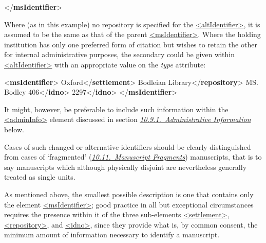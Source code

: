 \begin{shaded}
{</\textbf{msIdentifier}>}\end{shaded}\egroup\par \noindent  Where (as in this example) no repository is specified for the \hyperref[TEI.altIdentifier]{<altIdentifier>}, it is assumed to be the same as that of the parent \hyperref[TEI.msIdentifier]{<msIdentifier>}. Where the holding institution has only one preferred form of citation but wishes to retain the other for internal administrative purposes, the secondary could be given within \hyperref[TEI.altIdentifier]{<altIdentifier>} with an appropriate value on the {\itshape type} attribute: \par\bgroup{}\exampleFont \begin{shaded}\noindent\mbox{}{<\textbf{msIdentifier}>}\mbox{}\newline 
{}Oxford{</\textbf{settlement}>}\mbox{}\newline 
{}Bodleian Library{</\textbf{repository}>}\mbox{}\newline 
{}MS. Bodley 406{</\textbf{idno}>}\mbox{}\newline 
{}\mbox{}\newline 
\hspace*{1em}2297{</\textbf{idno}>}\mbox{}\newline 
{}\mbox{}\newline 
{</\textbf{msIdentifier}>}\end{shaded}\egroup\par \noindent  It might, however, be preferable to include such information within the \hyperref[TEI.adminInfo]{<adminInfo>} element discussed in section \textit{\hyperref[msadad]{10.9.1.\ Administrative Information}} below.\par
Cases of such changed or alternative identifiers should be clearly distinguished from cases of ‘fragmented’ (\textit{\hyperref[msfg]{10.11.\ Manuscript Fragments}}) manuscripts, that is to say manuscripts which although physically disjoint are nevertheless generally treated as single units.\par
As mentioned above, the smallest possible description is one that contains only the element \hyperref[TEI.msIdentifier]{<msIdentifier>}; good practice in all but exceptional circumstances requires the presence within it of the three sub-elements \hyperref[TEI.settlement]{<settlement>}, \hyperref[TEI.repository]{<repository>}, and \hyperref[TEI.idno]{<idno>}, since they provide what is, by common consent, the minimum amount of information necessary to identify a manuscript.
